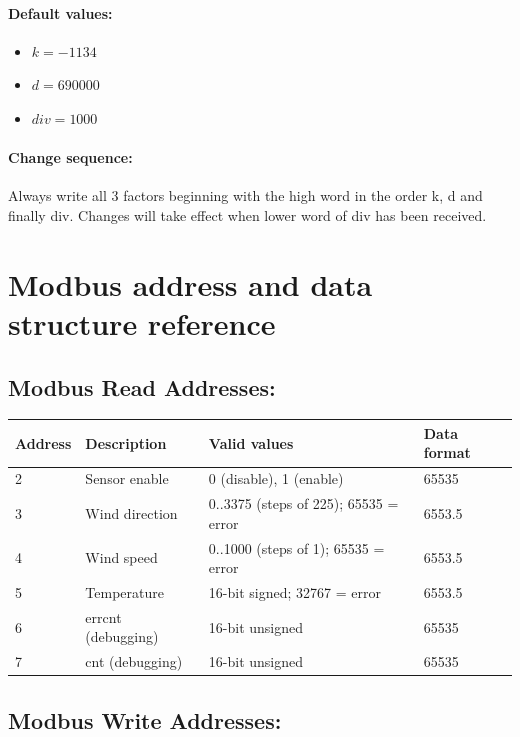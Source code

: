 \paragraph{Default values:}
\begin{itemize}
\item $k = -1134  $
\item $d = 690000 $
\item $div = 1000 $
\end{itemize}

\paragraph{Change sequence: }Always write all 3 factors beginning with the high word in the order k, d and finally div. Changes will take effect when lower word of div has been received.

\section{Modbus address and data structure reference}
\label{sec:modbus_address_ref}
\subsection{Modbus Read Addresses:}

\begin{tabular}{|l|l|l|l|}
\hline \textbf{Address} & \textbf{Description} & \textbf{Valid values} & \textbf{Data format} \\ 
\hline
\hline 2 & Sensor enable & 0 (disable), 1 (enable) & 65535 \\ 
\hline 3 & Wind direction & 0..3375 (steps of 225); 65535 = error & 6553.5 \\ 
\hline 4 & Wind speed & 0..1000 (steps of 1); 65535 = error & 6553.5 \\ 
\hline 5 & Temperature & 16-bit signed; 32767 = error & 6553.5 \\ 
\hline 6 & errcnt (debugging) & 16-bit unsigned & 65535 \\ 
\hline 7 & cnt (debugging) & 16-bit unsigned & 65535 \\ 
\hline 
\end{tabular} 

\subsection{Modbus Write Addresses:}

